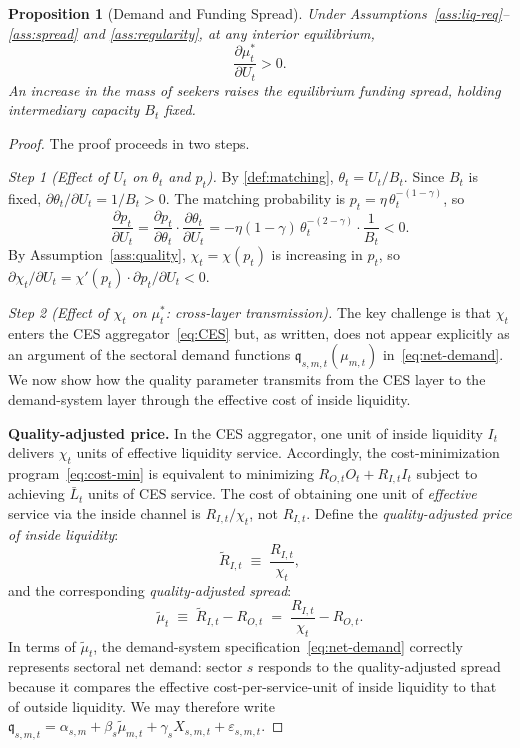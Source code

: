 \documentclass[12pt]{article}
\newtheorem{proposition}{Proposition}
\theoremstyle{definition}
\newcommand{\1}[1]{\mathds{1}\left[#1\right]}
\begin{document}
\begin{proposition}[Demand and Funding Spread]
  \label{prop:demand}
  Under Assumptions~\ref{ass:liq-req}--\ref{ass:spread} and
  \ref{ass:regularity}, at any interior equilibrium,
  \[
    \frac{\partial \mu_t^*}{\partial U_t} > 0.
  \]
  An increase in the mass of seekers raises the equilibrium funding spread,
  holding intermediary capacity $B_t$ fixed.
\end{proposition}

\begin{proof}
  The proof proceeds in two steps.

  \textit{Step 1 (Effect of $U_t$ on $\theta_t$ and $p_t$).}
  By \cref{def:matching}, $\theta_t = U_t/B_t$. Since $B_t$ is fixed,
  $\partial\theta_t/\partial U_t = 1/B_t > 0$. The matching probability is
  $p_t = \eta\,\theta_t^{-(1-\gamma)}$, so
  \[
    \frac{\partial p_t}{\partial U_t} =
    \frac{\partial p_t}{\partial \theta_t}\cdot\frac{\partial\theta_t}{\partial U_t}
    = -\eta(1-\gamma)\,\theta_t^{-(2-\gamma)} \cdot \frac{1}{B_t} < 0.
  \]
  By Assumption~\ref{ass:quality}, $\chi_t = \chi(p_t)$ is increasing in $p_t$,
  so $\partial\chi_t/\partial U_t = \chi'(p_t)\cdot\partial p_t/\partial U_t < 0$.

  \textit{Step 2 (Effect of $\chi_t$ on $\mu_t^*$: cross-layer transmission).}
  The key challenge is that $\chi_t$ enters the CES aggregator~\eqref{eq:CES}
  but, as written, does not appear explicitly as an argument of the sectoral
  demand functions $\mathfrak{q}_{s,m,t}(\mu_{m,t})$ in~\eqref{eq:net-demand}.
  We now show how the quality parameter transmits from the CES layer to the
  demand-system layer through the effective cost of inside liquidity.

  \textbf{Quality-adjusted price.} In the CES aggregator, one unit of inside
  liquidity $I_t$ delivers $\chi_t$ units of effective liquidity service.
  Accordingly, the cost-minimization program~\eqref{eq:cost-min} is equivalent
  to minimizing $R_{O,t} O_t + R_{I,t} I_t$ subject to achieving $\bar{L}_t$
  units of CES service. The cost of obtaining one unit of \emph{effective}
  service via the inside channel is $R_{I,t}/\chi_t$, not $R_{I,t}$. Define
  the \emph{quality-adjusted price of inside liquidity}:
  \[
    \tilde{R}_{I,t} \;\equiv\; \frac{R_{I,t}}{\chi_t},
  \]
  and the corresponding \emph{quality-adjusted spread}:
  \[
    \tilde{\mu}_t \;\equiv\; \tilde{R}_{I,t} - R_{O,t}
    \;=\; \frac{R_{I,t}}{\chi_t} - R_{O,t}.
  \]
  In terms of $\tilde{\mu}_t$, the demand-system specification~\eqref{eq:net-demand}
  correctly represents sectoral net demand: sector $s$ responds to the
  quality-adjusted spread because it compares the effective cost-per-service-unit
  of inside liquidity to that of outside liquidity. We may therefore write
  $\mathfrak{q}_{s,m,t} = \alpha_{s,m} + \beta_s \tilde{\mu}_{m,t} +
  \gamma_s X_{s,m,t} + \varepsilon_{s,m,t}$.


\end{proof}
\end{document}
